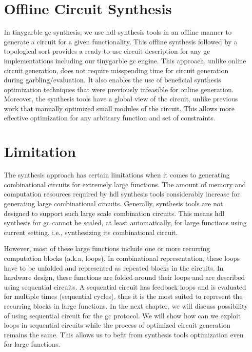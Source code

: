 \section{Offline Circuit Synthesis}\label{sec:syn-offline}
In \gls{tinygarble} \acrshort{gc} synthesis, we use \acrshort{hdl} synthesis tools in an offline manner to generate a circuit for a given functionality.
This offline synthesis followed by a topological sort provides a ready-to-use circuit description for any \acrshort{gc} implementations including our \gls{tinygarble} \acrshort{gc} engine.
This approach, unlike online circuit generation, does not require misspending time for circuit generation during garbling/evaluation.
It also enables the use of beneficial synthesis optimization techniques that were previously infeasible for online generation.
Moreover, the synthesis tools have a global view of the circuit, unlike previous work that manually optimized small modules of the circuit.
This allows more effective optimization for any arbitrary function and set of constraints.

\section{Limitation}\label{sec:syn-limit}
The synthesis approach has certain limitations when it comes to generating combinational circuits for extremely large functions.
The amount of memory and computation resources required by \acrshort{hdl} synthesis tools considerably increase for generating large combinational circuits.
Generally, synthesis tools are not designed to support such large scale combination circuits.
This means \acrshort{hdl} synthesis for \acrshort{gc} cannot be scaled, at least automatically, for large functions using current setting, i.e., synthesizing its combinational circuit.

However, most of these large functions include one or more recurring computation blocks (a.k.a, loops).
In combinational representation, these loops have to be unfolded and represented as repeated blocks in the circuits.
In hardware design, these functions are folded around their loops and are described using sequential circuits.
A sequential circuit has feedback loops and is evaluated for multiple times (sequential cycles), thus it is the most suited to represent the recurring blocks in large functions.
In the next chapter, we will discuss possibility of using sequential circuit for the \acrshort{gc} protocol.
We will show how can we exploit loops in sequential circuits while the process of optimized circuit generation remains the same.
This allows us to befit from synthesis tools optimization even for large functions.
